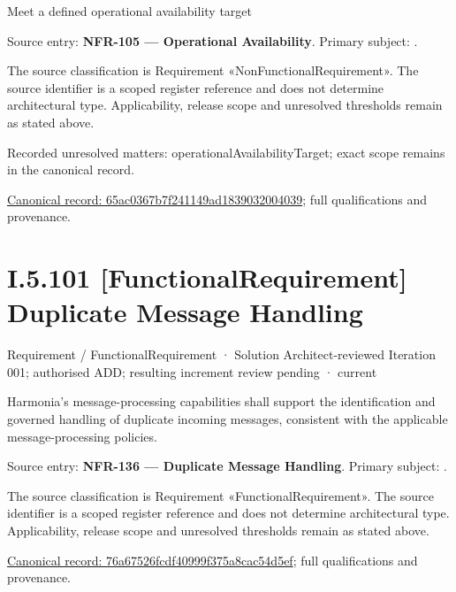Meet a defined operational availability target



Source entry: \textbf{NFR-105 — Operational Availability}. Primary subject: \texttt{}.



The source classification is Requirement «NonFunctionalRequirement». The source identifier is a scoped register reference and does not determine architectural type. Applicability, release scope and unresolved thresholds remain as stated above.


{\small Recorded unresolved matters: operationalAvailabilityTarget; exact scope remains in the canonical record.}\par
{\footnotesize \href{../../../../../../../continuum/motivation/requirement/non-functional-requirement/65ac0367b7f241149ad1839032004039.md}{Canonical record: 65ac0367b7f241149ad1839032004039}; full qualifications and provenance.}\par
\section*{I.5.101 [FunctionalRequirement] Duplicate Message Handling}
\label{navigation:I.5.101}

\label{element:76a67526fcdf40999f375a8cac54d5ef}
{\small Requirement / FunctionalRequirement · Solution Architect-reviewed Iteration 001; authorised ADD; resulting increment review pending · current}\par

Harmonia's message-processing capabilities shall support the identification and governed handling of duplicate incoming messages, consistent with the applicable message-processing policies.



Source entry: \textbf{NFR-136 — Duplicate Message Handling}. Primary subject: \texttt{}.



The source classification is Requirement «FunctionalRequirement». The source identifier is a scoped register reference and does not determine architectural type. Applicability, release scope and unresolved thresholds remain as stated above.


{\footnotesize \href{../../../../../../../continuum/motivation/requirement/functional-requirement/76a67526fcdf40999f375a8cac54d5ef.md}{Canonical record: 76a67526fcdf40999f375a8cac54d5ef}; full qualifications and provenance.}\par
